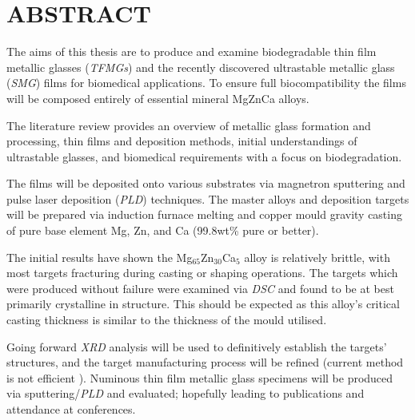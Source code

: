 \section{ABSTRACT}
 
The aims of this thesis are to produce and examine biodegradable thin film metallic glasses (\textit{TFMGs}) and the recently discovered ultrastable metallic glass (\textit{SMG}) films for biomedical applications. To ensure full biocompatibility the films will be composed entirely of essential mineral MgZnCa alloys.

The literature review provides an overview of metallic glass formation and processing, thin films and deposition methods, initial understandings of ultrastable glasses, and biomedical requirements with a focus on biodegradation. 

The films will be deposited onto various substrates via magnetron sputtering and pulse laser deposition (\textit{PLD}) techniques. The master alloys and deposition targets will be prepared via induction furnace melting and copper mould gravity casting of pure base element Mg, Zn, and Ca (99.8wt\% pure or better).

The initial results have shown the Mg$_{65}$Zn$_{30}$Ca$_{5}$ alloy is relatively brittle, with most targets fracturing during casting or shaping operations. The targets which were produced without failure were examined via \textit{DSC} and found to be at best primarily crystalline in structure. This should be expected as this alloy’s critical casting thickness is similar to the thickness of the mould utilised. 

Going forward \textit{XRD} analysis will be used to definitively establish the targets’ structures, and the target manufacturing process will be refined (current method is not efficient ). Numinous thin film metallic glass specimens will be produced via sputtering/\textit{PLD} and evaluated; hopefully leading to publications and attendance at conferences. 
